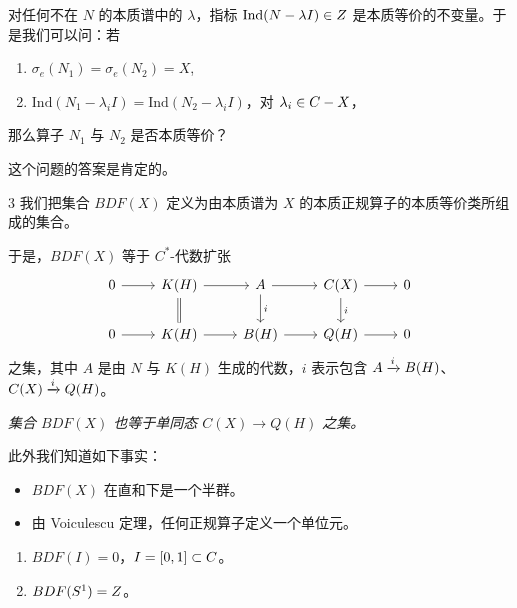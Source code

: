 对任何不在 $N$ 的本质谱中的 $\lambda$，指标 $\mathrm{Ind}(N-\lambda I) \in Z$ 是本质等价的不变量。于是我们可以问：若
\begin{enumerate}[label=\arabic*.]
\item $\sigma_e(N_1) = \sigma_e(N_2) = X$,
\item $\mathrm{Ind}(N_1-\lambda_i I) = \mathrm{Ind}(N_2-\lambda_i I)$，对 $\lambda_i \in C - X$，
\end{enumerate}
那么算子 $N_1$ 与 $N_2$ 是否本质等价？

这个问题的答案是肯定的。

\begin{defn}{3}
我们把集合 $BDF(X)$ 定义为由本质谱为 $X$ 的本质正规算子的本质等价类所组成的集合。
\end{defn}

于是，$BDF(X)$ 等于 $C^*$-代数扩张
\[
  \begin{tikzcd}
    0 \arrow[r] & K(H) \arrow[r] \arrow[d,equal] & A \arrow[r] \arrow[d,"i"] & C(X) \arrow[r] \arrow[d,"i"] & 0 \\
    0 \arrow[r] & K(H) \arrow[r] & B(H) \arrow[r] & Q(H) \arrow[r] & 0
  \end{tikzcd}
\]
之集，其中 $A$ 是由 $N$ 与 $K(H)$ 生成的代数，$i$ 表示包含 $A \xrightarrow{i} B(H)$、$C(X) \xrightarrow{i} Q(H)$。

\emph{集合 $BDF(X)$ 也等于单同态 $C(X) \to Q(H)$ 之集。}

此外我们知道如下事实：
\begin{itemize}
\item $BDF(X)$ 在直和下是一个半群。
\item 由 Voiculescu 定理，任何正规算子定义一个单位元。
\end{itemize}

\begin{enumerate}[label=\arabic*.]
\item $BDF(I) = 0$，$I = [0,1] \subset C$。
\item $BDF(S^1) = Z$。
\end{enumerate}


